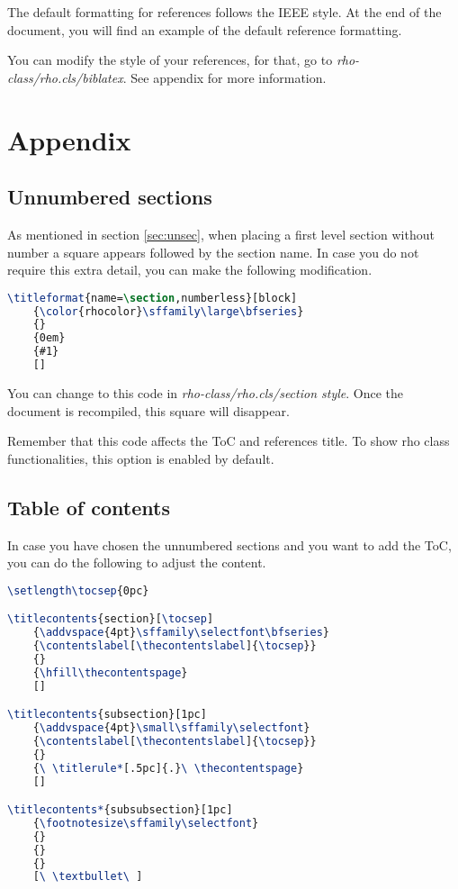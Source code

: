 \documentclass[9pt,a4paper,twoside]{rho-class/rho}
\begin{document}
    The default formatting for references follows the IEEE style. At the end of the document, you will find an example of the default reference formatting.

    You can modify the style of your references, for that, go to \textit{rho-class/rho.cls/biblatex}. See appendix for more information.

\section{Appendix}

    \subsection{Unnumbered sections}

        As mentioned in section \ref{sec:unsec}, when placing a first level section without number a square appears followed by the section name. In case you do not require this extra detail, you can make the following modification.

\nolinenumbers
\begin{lstlisting}[language=TeX, caption=Alternative unnumbered section.]
\titleformat{name=\section,numberless}[block]
    {\color{rhocolor}\sffamily\large\bfseries}
    {}
    {0em}
    {#1}
    []
\end{lstlisting}

        You can change to this code in \textit{rho-class/rho.cls/section style}. Once the document is recompiled, this square will disappear. 

        Remember that this code affects the ToC and references title. To show rho class functionalities, this option is enabled by default.

    \subsection{Table of contents}
    
        In case you have chosen the unnumbered sections and you want to add the ToC, you can do the following to adjust the content.

\nolinenumbers
\begin{lstlisting}[language=TeX, caption=ToC when unnumbered section is chosen.]
\setlength\tocsep{0pc}

\titlecontents{section}[\tocsep]
    {\addvspace{4pt}\sffamily\selectfont\bfseries}
    {\contentslabel[\thecontentslabel]{\tocsep}}
    {}
    {\hfill\thecontentspage}
    []

\titlecontents{subsection}[1pc]
    {\addvspace{4pt}\small\sffamily\selectfont}
    {\contentslabel[\thecontentslabel]{\tocsep}}
    {}
    {\ \titlerule*[.5pc]{.}\ \thecontentspage}
    []

\titlecontents*{subsubsection}[1pc]
    {\footnotesize\sffamily\selectfont}
    {}
    {}
    {}
    [\ \textbullet\ ]
\end{lstlisting}
\end{document}
